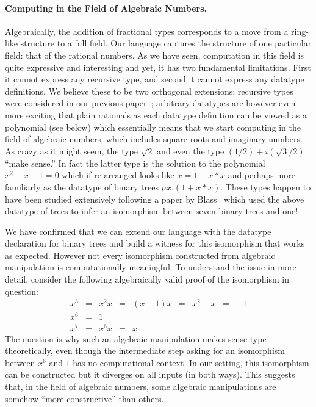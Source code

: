 \documentclass[11pt]{article}
\begin{document}
\paragraph*{Computing in the Field of Algebraic Numbers.}
\label{sec:algebraic-field}
Algebraically, the addition of fractional types corresponds to a move from a
ring-like structure to a full field. Our language captures the structure of
one particular field: that of the rational numbers. As we have seen,
computation in this field is quite expressive and interesting and yet, it has
two fundamental limitations. First it cannot express any recursive type, and
second it cannot express any datatype definitions. We believe these to be two
orthogonal extensions: recursive types were considered in our previous
paper~\cite{James:2012:IE:2103656.2103667}; arbitrary datatypes are however
even more exciting that plain rationals as each datatype definition can be
viewed as a polynomial (see below) which essentially means that we start
computing in the field of algebraic numbers, which includes square roots and
imaginary numbers. As crazy as it might seem, the type $\sqrt{2}$ and even
the type $(1/2)+i(\sqrt{3}/2)$ ``make sense.''  In fact the latter type is
the solution to the polynomial $x^2-x+1=0$ which if re-arranged looks like
$x=1+x*x$ and perhaps more familiarly as the datatype of binary trees $\mu
x.(1+x*x)$. These types happen to have been studied extensively following a
paper by Blass~\cite{seventrees} which used the above datatype of trees to
infer an isomorphism between seven binary trees and one!

We have confirmed that we can extend our language with the datatype
declaration for binary trees and build a witness for this isomorphism that
works as expected. However not every isomorphism constructed from algebraic
manipulation is computationally meaningful. To understand the issue in more
detail, consider the following algebraically valid proof of the isomorphism
in question:
\[\begin{array}{rclclclcl}
x^3 &=& x^2 x &=& (x-1) x &=& x^2 - x &=& -1 \\
x^6 &=& 1 \\
x^7 &=& x^6 x &=& x
\end{array}\]
The question is why such an algebraic manipulation makes sense type
theoretically, even though the intermediate step asking for an isomorphism
between $x^6$ and $1$ has no computational context. In our setting, this
isomorphism can be constructed but it diverges on all inputs (in both
ways). This suggests that, in the field of algebraic numbers, some algebraic
manipulations are somehow ``more constructive'' than others.
\end{document}
